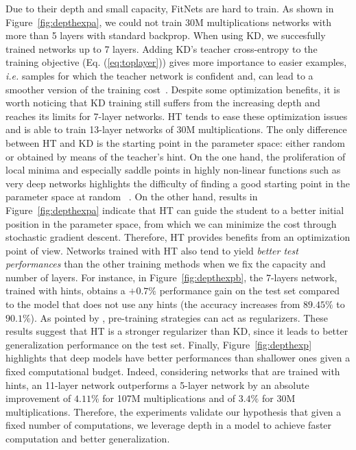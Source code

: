 \documentclass{article} %
\begin{document}
Due to their depth and small capacity, FitNets are hard to train. As shown in Figure~\ref{fig:depthexpa}, we could
not train 30M multiplications networks with more than 5 layers with standard
backprop. When using KD, we succesfully trained networks up to 7
layers.
Adding KD's teacher cross-entropy to the training objective (Eq. (\ref{eq:toplayer}))
gives more importance to easier examples, \textit{i.e.} samples for which the teacher
network is confident and, can lead to a smoother version of the training
cost~\citep{bengio.2009}. Despite some optimization benefits, it is worth
noticing that KD training still suffers from the increasing depth and reaches
its limits for 7-layer networks. HT tends to ease these optimization issues and is able to train 13-layer networks of 30M multiplications.
 The only difference between HT and KD is the starting point
in the parameter space: either random or obtained by means of the teacher's
hint. On the one hand, the proliferation of local minima and especially saddle points in
highly non-linear functions such as very deep networks highlights the difficulty of finding a good starting point in the parameter
space at random ~\citep{dauphin.2014}. On the other hand, results in Figure~\ref{fig:depthexpa}
indicate that HT can guide the student to a better initial
position in the parameter space, from which we can minimize the cost through
stochastic gradient descent.  Therefore, HT provides benefits from
an optimization point of view.
Networks trained with HT also tend to yield {\em better test
performances} than the other training methods when we fix the capacity and
number of layers.  For instance, in Figure~\ref{fig:depthexpb}, the 7-layers
network, trained with hints, obtains a $+0.7\%$ performance gain on the test
set compared to the model that does not use any hints (the
accuracy increases from $89.45\%$ to $90.1\%$). As pointed by
\cite{Erhan09}, pre-training strategies can act as regularizers. These results
suggest that HT is a stronger regularizer than KD, since it leads to
better generalization performance on the test set.
Finally, Figure~\ref{fig:depthexp} highlights that deep models have better performances
than shallower ones given a fixed computational budget.  Indeed, considering
networks that are trained with hints, an 11-layer network outperforms a 5-layer network by 
an absolute improvement of $4.11\%$ for 107M multiplications and of
$3.4\%$ for 30M multiplications. Therefore, the experiments validate
our hypothesis that given a fixed number of computations, we leverage
depth in a model to achieve faster computation and better generalization.
\end{document}
